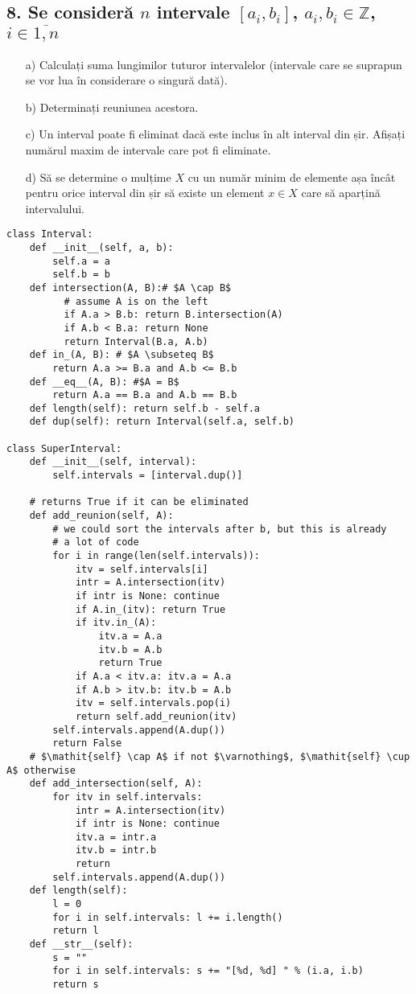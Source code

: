 \documentclass[11pt]{article}
\begin{document}
\begin{itemize}
\begin{itemize}
\subsection*{8. Se consideră \(n\) intervale \([a_i,b_i]\), \(a_i, b_i \in \mathbb{Z}\), \(i \in \overline{1,n}\)}
\label{sec:orge9a51b0}
\begin{enumerate}
\item[a)] Calculați suma lungimilor tuturor intervalelor (intervale care se suprapun se vor lua în considerare o singură dată).
\item[b)] Determinați reuniunea acestora.
\item[c)] Un interval poate fi eliminat dacă este inclus în alt interval din șir. Afișați numărul maxim de intervale care pot fi eliminate.
\item[d)] Să se determine o mulțime $X$ cu un număr minim de elemente așa încât pentru orice interval din șir să existe un element $x \in X$ care să aparțină intervalului.
\end{enumerate}
\begin{verbatim}
class Interval:
    def __init__(self, a, b):
        self.a = a
        self.b = b
    def intersection(A, B):# $A \cap B$
          # assume A is on the left
          if A.a > B.b: return B.intersection(A)
          if A.b < B.a: return None
          return Interval(B.a, A.b)
    def in_(A, B): # $A \subseteq B$
        return A.a >= B.a and A.b <= B.b
    def __eq__(A, B): #$A = B$
        return A.a == B.a and A.b == B.b
    def length(self): return self.b - self.a
    def dup(self): return Interval(self.a, self.b)

class SuperInterval:
    def __init__(self, interval):
        self.intervals = [interval.dup()]

    # returns True if it can be eliminated
    def add_reunion(self, A):
        # we could sort the intervals after b, but this is already
        # a lot of code
        for i in range(len(self.intervals)):
            itv = self.intervals[i]
            intr = A.intersection(itv)
            if intr is None: continue
            if A.in_(itv): return True
            if itv.in_(A):
                itv.a = A.a
                itv.b = A.b
                return True
            if A.a < itv.a: itv.a = A.a
            if A.b > itv.b: itv.b = A.b
            itv = self.intervals.pop(i)
            return self.add_reunion(itv)
        self.intervals.append(A.dup())
        return False
    # $\mathit{self} \cap A$ if not $\varnothing$, $\mathit{self} \cup A$ otherwise
    def add_intersection(self, A):
        for itv in self.intervals:
            intr = A.intersection(itv)
            if intr is None: continue
            itv.a = intr.a
            itv.b = intr.b
            return
        self.intervals.append(A.dup())
    def length(self):
        l = 0
        for i in self.intervals: l += i.length()
        return l
    def __str__(self):
        s = ""
        for i in self.intervals: s += "[%d, %d] " % (i.a, i.b)
        return s


\end{verbatim}
\end{itemize}
\end{itemize}
\end{document}
